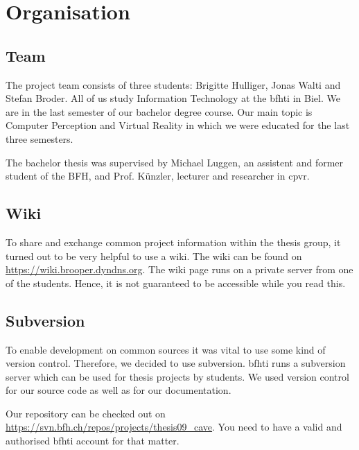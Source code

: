 
\chapter{Organisation}

\section{Team}
The project team consists of three students: Brigitte Hulliger, Jonas Walti and Stefan Broder. All of us study Information Technology at the \gls{bfhti} in Biel. We are in the last semester of our bachelor degree course. Our main topic is Computer Perception and Virtual Reality in which we were educated for the last three semesters.

The bachelor thesis was supervised by Michael Luggen, an assistent and former student of the BFH, and Prof. K\"unzler, lecturer and researcher in \gls{cpvr}. 

\section{Wiki}
To share and exchange common project information within the thesis group, it turned out to be very helpful to use a wiki. The wiki can be found on \href{https://wiki.brooper.dyndns.org}{https://wiki.brooper.dyndns.org}. The wiki page runs on a private server from one of the students. Hence, it is not guaranteed to be accessible while you read this.

\section{Subversion}
To enable development on common sources it was vital to use some kind of version control. Therefore, we decided to use subversion. \gls{bfhti} runs a subversion server which can be used for thesis projects by students. We used version control for our source code as well as for our documentation.

Our repository can be checked out on \href{https://svn.bfh.ch/repos/projects/thesis09\_cave}{https://svn.bfh.ch/repos/projects/thesis09\_cave}. You need to have a valid and authorised \gls{bfhti} account for that matter.
